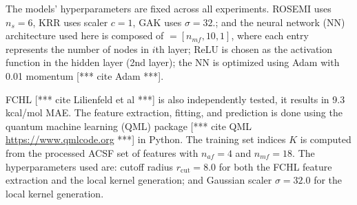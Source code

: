\documentclass[12pt]{article}
\def\att{                    %
        \marginpar[ \hspace*{\fill} \raisebox{-0.2em}{\rule{2mm}{1.2em}} ]
        {\raisebox{-0.2em}{\rule{2mm}{1.2em}} }
        }
\def\at#1{[*** \att #1 ***]}  %
\begin{document}
The models' hyperparameters are fixed across all experiments. ROSEMI uses $n_s = 6$, KRR uses scaler $c=1$, GAK uses $\sigma = 32.$; and the neural network (NN) architecture used here is composed of $ = [n_{mf}, 10, 1]$, where each entry represents the number of nodes in $i$th layer; ReLU is chosen as the activation function in the hidden layer (2nd layer); the NN is optimized using Adam with 0.01 momentum \at{cite Adam}. 

FCHL \at{cite Lilienfeld et al} is also independently tested, it results in 9.3 kcal/mol MAE. The feature extraction, fitting, and prediction is done using the quantum machine learning (QML) package \at{cite QML \url{https://www.qmlcode.org}} in Python. 
The training set indices $K$ is computed from the processed ACSF set of features with $n_{af} = 4$ and $n_{mf} = 18$.
The hyperparameters used are: cutoff radius $r_\text{cut} = 8.0$ for both the FCHL feature extraction and the local kernel generation; and Gaussian scaler $\sigma = 32.0$ for the local kernel generation.
\end{document}
